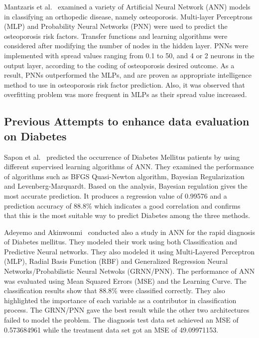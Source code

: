 \documentclass[journal]{./IEEE/IEEEtran}
\begin{document}
	Mantzaris et al.~\cite{Mantzaris08} examined a variety of Artificial Neural Network (ANN) models in classifying an orthopedic disease, namely osteoporosis. Multi-layer Perceptrons (MLP) and Probability Neural Networks (PNN) were used to predict the osteoporosis risk factors. Transfer functions and learning algorithms were considered after modifying the number of nodes in the hidden layer. PNNs were implemented with spread values ranging from 0.1 to 50, and 4 or 2 neurons in the output layer, according to the coding of osteoporosis desired outcome. As a result, PNNs outperformed the MLPs, and are proven as appropriate intelligence method to use in osteoporosis risk factor prediction. Also, it was observed that overfitting problem was more frequent in MLPs as their spread value increased.


\subsection{Previous Attempts to enhance data evaluation on Diabetes}
	Sapon et al.~\cite{Sapon11} predicted the occurrence of Diabetes Mellitus patients by using different supervised learning algorithms of ANN. They examined the performance of algorithms such as BFGS Quasi-Newton algorithm, Bayesian Regularization and Levenberg-Marquardt. Based on the analysis, Bayesian regulation gives the most accurate prediction. It produces a regression value of 0.99576 and a prediction accuracy of 88.8\% which indicates a good correlation and confirms that this is the most suitable way to predict Diabetes among the three methods.

	Adeyemo and Akinwonmi~\cite{Adeyemo11} conducted also a study in ANN for the rapid diagnosis of Diabetes mellitus. They modeled their work using both Classification and Predictive Neural networks. They also modeled it using Multi-Layered Perceptron (MLP), Radial Basis Function (RBF) and Generalized Regression Neural Networks/Probabilistic Neural Netwoks (GRNN/PNN). The performance of ANN was evaluated using Mean Squared Errors (MSE) and the Learning Curve. The classification results show that 88.8\% were classified correctly. They also highlighted the importance of each variable as a contributor in classification process. The GRNN/PNN gave the best result  while the other two architectures failed to model the problem. The diagnosis test data set achieved an MSE of 0.573684961 while the treatment data set got an MSE of 49.09971153. 
\end{document}
